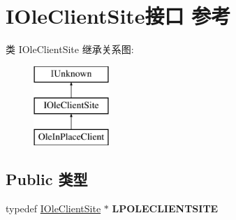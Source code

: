 \hypertarget{interface_i_ole_client_site}{}\section{I\+Ole\+Client\+Site接口 参考}
\label{interface_i_ole_client_site}
类 I\+Ole\+Client\+Site 继承关系图\+:\begin{figure}[H]
\begin{center}
\leavevmode
\includegraphics[height=3.000000cm]{interface_i_ole_client_site}
\end{center}
\end{figure}
\subsection*{Public 类型}
\begin{DoxyCompactItemize}
\item 
\mbox{\label{interface_i_ole_client_site_a4ac2fc344e81879fff1c062f72f05d46}} 
typedef \hyperlink{interface_i_ole_client_site}{I\+Ole\+Client\+Site} $\ast$ {\bfseries L\+P\+O\+L\+E\+C\+L\+I\+E\+N\+T\+S\+I\+TE}
\end{DoxyCompactItemize}
